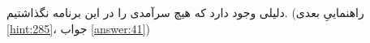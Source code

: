 \section{}
\paragraph{}\label{hint:320}
دلیلی وجود دارد که هیچ سرآمدی را در این برنامه نگذاشتیم. (راهنماییِ بعدی \ref{hint:285}، جواب \ref{answer:41})